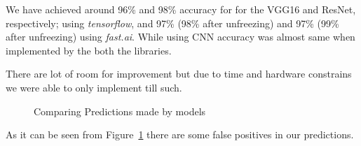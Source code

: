 \documentclass[10pt]{report}
\begin{document}
	We have achieved around 96\% and 98\% accuracy for for the VGG16 and ResNet,
	respectively; using \textit{tensorflow}, and 97\% (98\% after unfreezing)
	and 97\% (99\% after unfreezing) using \textit{fast.ai}. While using CNN
	accuracy was almost same when implemented by the both the libraries.

	There are lot of room for improvement but due to time and hardware
	constrains we were able to only implement till such.

	\begin{figure}[H]
		\centering
		\hspace{0.3cm}
		\caption{Comparing Predictions made by models}
		\label{fig:Results_Comparison}
	\end{figure}

	As it can be seen from Figure~\ref{fig:Results_Comparison} there are some false
	positives in our predictions.
\end{document}
